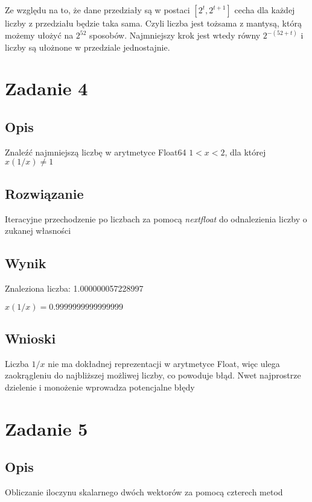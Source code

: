 \documentclass[12pt, letterpaper]{article}
\begin{document}
Ze względu na to, że dane przedziały są w postaci $[2^{t}, 2^{t + 1}]$ cecha
dla każdej liczby z przedziału
będzie taka sama. Czyli liczba jest tożsama z mantysą, którą możemy ułożyć na
$2^{52}$ sposobów.
Najmniejszy krok jest wtedy równy $2^{-(52 + t)}$ i liczby są ułożnone w
przedziale jednostajnie.

\section{Zadanie 4}

\subsection{Opis}

Znaleźć najmniejszą liczbę w arytmetyce Float64 $ 1 < x < 2$, dla której
$x(1/x) \neq 1$

\subsection{Rozwiązanie}

Iteracyjne przechodzenie po liczbach za pomocą \textit{nextfloat} do
odnalezienia liczby o zukanej własności

\subsection{Wynik}

Znaleziona liczba: 1.000000057228997

$x(1/x) = 0.9999999999999999$

\subsection{Wnioski}

Liczba $1/x$ nie ma dokładnej reprezentacji
w arytmetyce Float, więc ulega zaokrągleniu do najbliższej możliwej liczby, co
powoduje błąd. Nwet najprostrze dzielenie i monożenie wprowadza potencjalne
błędy

\section{Zadanie 5}

\subsection{Opis}

Obliczanie iloczynu skalarnego dwóch wektorów za pomocą czterech metod
\end{document}
